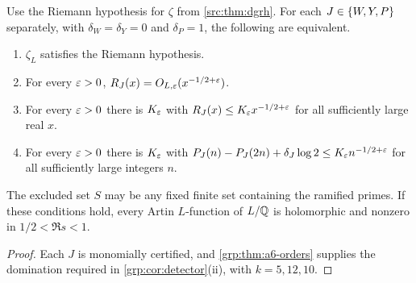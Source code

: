 \begin{theorem}\label{grp:thm:a6-criterion}
Use the Riemann hypothesis for $\zeta$ from \cref{src:thm:dgrh}. For each
$J\in\{W,Y,P\}$ separately, with $\delta_W=\delta_Y=0$ and $\delta_P=1$, the
following are equivalent.
\begin{enumerate}[label=\textup{(\roman*)}]
\item $\zeta_L$ satisfies the Riemann hypothesis.
\item For every $\varepsilon>0$, $R_J(x)=O_{L,\varepsilon}(x^{-1/2+\varepsilon})$.
\item For every $\varepsilon>0$ there is $K_\varepsilon$ with
$R_J(x)\le K_\varepsilon x^{-1/2+\varepsilon}$ for all sufficiently large real $x$.
\item For every $\varepsilon>0$ there is $K_\varepsilon$ with
$P_J(n)-P_J(2n)+\delta_J\log2\le K_\varepsilon n^{-1/2+\varepsilon}$ for all sufficiently
large integers $n$.
\end{enumerate}
The excluded set $S$ may be any fixed finite set containing the ramified
primes. If these conditions hold, every Artin $L$-function of $L/\mathbb{Q}$ is
holomorphic and nonzero in $1/2<\Re s<1$.
\end{theorem}

\begin{proof}
Each $J$ is monomially certified, and \cref{grp:thm:a6-orders} supplies the
domination required in \cref{grp:cor:detector}(ii), with $k=5,12,10$.
\end{proof}

